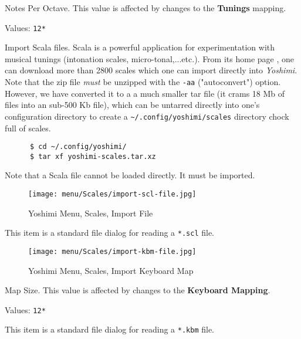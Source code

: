    Notes Per Octave.
   This value is affected by changes to the \textbf{Tunings} mapping.

   Values: \texttt{12*}

   Import Scala files.
   Scala is a powerful application for experimentation with musical tunings
   (intonation scales, micro-tonal,...etc.). From its home page \cite{scala},
   one can download more than 2800 scales which one can import directly into
   \textsl{Yoshimi}.  Note that the zip file \textsl{must} be unzipped with
   the \texttt{-aa} ("autoconvert") option.  However, we have converted it to a
   a much smaller tar file (it crams 18 Mb of files into an sub-500 Kb file),
   which can be untarred directly into
   one's configuration directory to create a
   \texttt{\textasciitilde/.config/yoshimi/scales} directory chock full of
   scales.

    \begin{verbatim}
      $ cd ~/.config/yoshimi/
      $ tar xf yoshimi-scales.tar.xz
    \end{verbatim}

    Note that a Scala file cannot be loaded directly.  It must be imported.

\begin{figure}[H]
   \centering
   \texttt{[image: menu/Scales/import-scl-file.jpg]}
   \caption{Yoshimi Menu, Scales, Import File}
   \label{fig:yoshimi_scales_import_file}
\end{figure}

   This item is a standard file dialog for reading
   a \texttt{*.scl} file.

\begin{figure}[H]
   \centering
   \texttt{[image: menu/Scales/import-kbm-file.jpg]}
   \caption{Yoshimi Menu, Scales, Import Keyboard Map}
   \label{fig:yoshimi_scales_import_keyboard_map}
\end{figure}

   Map Size.
   This value is affected by changes to the \textbf{Keyboard Mapping}.

   Values: \texttt{12*}

   This item is a standard file dialog for reading
   a \texttt{*.kbm} file.


